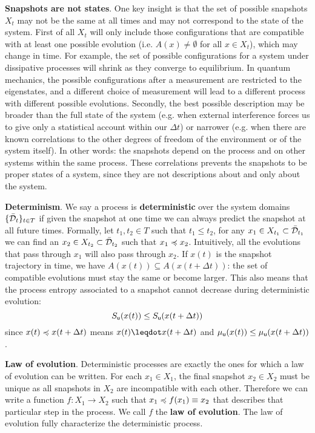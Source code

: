 \documentclass[10pt, onecolumn, longbibliography, nofootinbib]{revtex4-2}
\begin{document}
\textbf{Snapshots are not states}. One key insight is that the set of possible snapshots $X_t$ may not be the same at all times and may not correspond to the state of the system. First of all $X_t$ will only include those configurations that are compatible with at least one possible evolution (i.e. $A(x) \neq \emptyset$ for all $x \in X_t$), which may change in time. For example, the set of possible configurations for a system under dissipative processes will shrink as they converge to equilibrium. In quantum mechanics, the possible configurations after a measurement are restricted to the eigenstates, and a different choice of measurement will lead to a different process with different possible evolutions. Secondly, the best possible description may be broader than the full state of the system (e.g. when external interference forces us to give only a statistical account within our $\Delta t$) or narrower (e.g. when there are known correlations to the other degrees of freedom of the environment or of the system itself). In other words: the snapshots depend on the process and on other systems within the same process. These correlations prevents the snapshots to be proper states of a system, since they are not descriptions about and only about the system.

\textbf{Determinism}. We say a process is \textbf{deterministic} over the system domains $\{\tdomain_t\}_{t \in T}$ if given the snapshot at one time we can always predict the snapshot at all future times. Formally, let $t_1, t_2 \in T$ such that $t_1 \leq t_2$, for any $x_1 \in X_{t_1} \subset \tdomain_{t_1}$ we can find an $x_2 \in X_{t_2} \subset \tdomain_{t_2}$ such that $x_1 \narrower x_2$. Intuitively, all the evolutions that pass through $x_1$ will also pass through $x_2$. If $x(t)$ is the snapshot trajectory in time, we have $A(x(t)) \subseteq A(x(t + \Delta t))$: the set of compatible evolutions must stay the same or become larger. This also means that the process entropy associated to a snapshot cannot decrease during deterministic evolution:
\begin{equation}\label{entropy_determinism}
	S_{\stmt[u]}(x(t)) \leq S_{\stmt[u]}(x(t + \Delta t))
\end{equation}
since $x(t)\narrower x(t+\Delta t)$ means $x(t) \finer x(t+\Delta t)$ and $\mu_{\stmt[u]}(x(t)) \leq \mu_{\stmt[u]}(x(t+\Delta t))$.

\textbf{Law of evolution}. Deterministic processes are exactly the ones for which a law of evolution can be written. For each $x_1 \in X_1$, the final snapshot $x_2 \in X_2$ must be unique as all snapshots in $X_2$ are incompatible with each other. Therefore we can write a function $f : X_1 \to X_2$ such that $x_1 \narrower f(x_1) \equiv x_2$ that describes that particular step in the process. We call $f$ the \textbf{law of evolution}. The law of evolution fully characterize the deterministic process.
\end{document}
